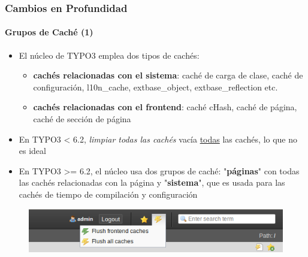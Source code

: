 \begin{frame}[fragile]
	\frametitle{Cambios en Profundidad}
	\framesubtitle{Grupos de Caché (1)}

	\begin{itemize}
		\item El núcleo de TYPO3 emplea dos tipos de cachés:

			\begin{itemize}
				\item \textbf{cachés relacionadas con el sistema}:
				caché de carga de clase, caché de configuración, l10n\_cache, extbase\_object, extbase\_reflection etc.
				\item \textbf{cachés relacionadas con el frontend}:
				caché cHash, caché de página, caché de sección de página
			\end{itemize}

		\item En TYPO3 < 6.2, \textit{limpiar todas las cachés} vacía \underline{todas} las cachés, lo que no es ideal

		\item En TYPO3 >= 6.2, el núcleo usa dos grupos de caché:\newline
			"\textbf{páginas}" con todas las cachés relacionadas con la página y "\textbf{sistema}", que es usada para las cachés de tiempo de compilación y configuración

	\end{itemize}

	\begin{figure}
		\includegraphics[width=0.5\linewidth]{Images/InDepthChanges/CacheGroups.png}
	\end{figure}

\end{frame}


